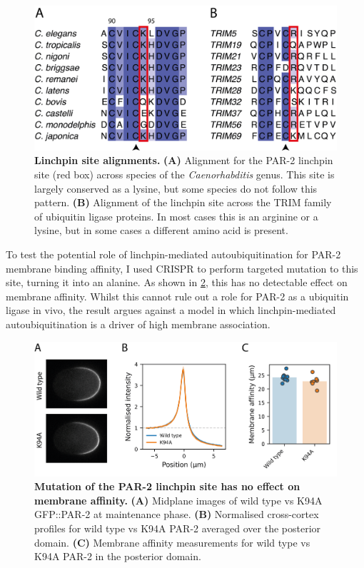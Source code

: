 \documentclass[12pt]{"report"}
\newcommand{\mycaption}[2]{\caption[#1]{\textbf{#1.} #2}}
\begin{document}
\begin{figure}
\includegraphics[scale=0.9]{linchpin_alignments}
\centering
\mycaption{Linchpin site alignments}{
\textbf{(A)} Alignment for the PAR-2 linchpin site (red box) across species of the \textit{Caenorhabditis} genus. This site is largely conserved as a lysine, but some species do not follow this pattern.
\textbf{(B)} Alignment of the linchpin site across the TRIM family of ubiquitin ligase proteins. In most cases this is an arginine or a lysine, but in some cases a different amino acid is present.
}
\label{fig:linchpin_alignments}
\end{figure}

To test the potential role of linchpin-mediated autoubiquitination for PAR-2 membrane binding affinity, I used CRISPR to perform targeted mutation to this site, turning it into an alanine. As shown in \cref{fig:linchpin_in_vivo}, this has no detectable effect on membrane affinity. Whilst this cannot rule out a role for PAR-2 as a ubiquitin ligase in vivo, the result argues against a model in which linchpin-mediated autoubiquitination is a driver of high membrane association.\\

\begin{figure}
\includegraphics[scale=0.9]{linchpin_in_vivo}
\centering
\mycaption{Mutation of the PAR-2 linchpin site has no effect on membrane affinity}{
\textbf{(A)} Midplane images of wild type vs K94A GFP::PAR-2 at maintenance phase.
\textbf{(B)} Normalised cross-cortex profiles for wild type vs K94A PAR-2 averaged over the posterior domain.
\textbf{(C)} Membrane affinity measurements for wild type vs K94A PAR-2 in the posterior domain.
}
\label{fig:linchpin_in_vivo}
\end{figure}
\end{document}
